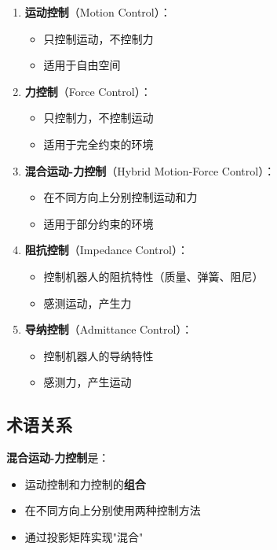 \documentclass[12pt,a4paper]{article}
\begin{document}
\begin{enumerate}
\item \textbf{运动控制}（Motion Control）：
\begin{itemize}
\item 只控制运动，不控制力
\item 适用于自由空间
\end{itemize}

\item \textbf{力控制}（Force Control）：
\begin{itemize}
\item 只控制力，不控制运动
\item 适用于完全约束的环境
\end{itemize}

\item \textbf{混合运动-力控制}（Hybrid Motion-Force Control）：
\begin{itemize}
\item 在不同方向上分别控制运动和力
\item 适用于部分约束的环境
\end{itemize}

\item \textbf{阻抗控制}（Impedance Control）：
\begin{itemize}
\item 控制机器人的阻抗特性（质量、弹簧、阻尼）
\item 感测运动，产生力
\end{itemize}

\item \textbf{导纳控制}（Admittance Control）：
\begin{itemize}
\item 控制机器人的导纳特性
\item 感测力，产生运动
\end{itemize}
\end{enumerate}

\subsection{术语关系}

\textbf{混合运动-力控制}是：
\begin{itemize}
\item 运动控制和力控制的\textbf{组合}
\item 在不同方向上分别使用两种控制方法
\item 通过投影矩阵实现"混合"
\end{itemize}
\end{document}
